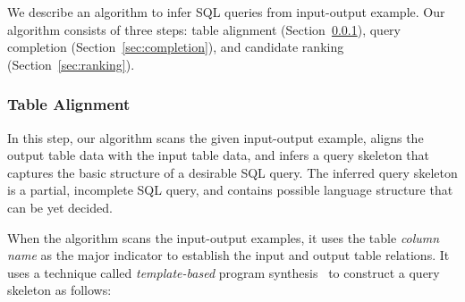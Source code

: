 We describe an algorithm to infer SQL queries from 
input-output example. Our algorithm consists of three steps:
table alignment (Section~\ref{sec:alignment}),
query completion (Section~\ref{sec:completion}), and
candidate ranking (Section~\ref{sec:ranking}).

\subsubsection{Table Alignment}
\label{sec:alignment}

In this step, our algorithm scans the given input-output example, aligns the output table data
with the input table data, and infers a query skeleton that captures the basic structure
of a desirable SQL query. The inferred query skeleton is a partial, incomplete SQL query, and
contains possible language structure that can be yet decided.

When the algorithm scans the input-output examples, it uses the table \textit{column name}
as the major indicator to establish the input and output table relations. It uses a technique called
\textit{template-based} program synthesis~\cite{sttt-synthesis} to construct a query skeleton as follows:


